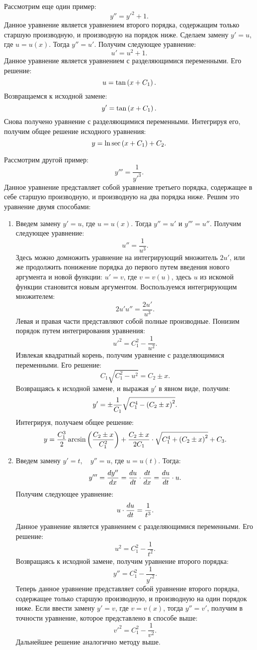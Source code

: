 		Рассмотрим еще один пример:
		\[ y'' = y'^2 + 1. \]
		Данное уравнение является уравнением второго порядка, содержащим только старшую производную, и производную на порядок ниже. Сделаем замену $y' = u$, где $u = u(x)$. Тогда $y'' = u'$. Получим следующее уравнение:
		\[ u' = u^2 + 1. \]
		Данное уравнение является уравнением с разделяющимися переменными. Его решение:
		\[ u = \tan\left( x + C_1 \right). \]
		Возвращаемся к исходной замене:
		\[ y' = \tan\left( x + C_1 \right). \]
		Снова получено уравнение с разделяющимися переменными. Интегрируя его, получим общее решение исходного уравнения:
		\[ y = \ln{\sec \left( x + C_1 \right) } + C_2. \]

		Рассмотрим другой пример:
		\[ y''' = \frac{1}{y'^3}. \]
		Данное уравнение представляет собой уравнение третьего порядка, содержащее в себе старшую производную, и производную на два порядка ниже. Решим это уравнение двумя способами:
		\begin{enumerate}
			\item Введем замену $y' = u$, где $u = u(x)$. Тогда $y'' = u'$ и $y''' = u''$. Получим следующее уравнение:
				\[ u'' = \frac{1}{u^3}. \]
				Здесь можно домножить уравнение на интегрирующий множитель $2u'$, или же продолжить понижение порядка до первого путем введения нового аргумента и новой функции: $u' = v$, где $v = v(u)$, здесь $u$ из искомой функции становится новым аргументом. Воспользуемся интегрирующим множителем:
				\[ 2u' u'' = \frac{2u'}{u^3}. \]
				Левая и правая части представляют собой полные производные. Понизим порядок путем интегрирования уравнения:
				\[ u'^2 = C_1^2 - \frac{1}{u^2}. \]
				Извлекая квадратный корень, получим уравнение с разделяющимися переменными. Его решение:
				\[ C_1 \sqrt{C_1^2 - u^2} = C_2 \pm x. \]
				Возвращаясь к исходной замене, и выражая $y'$ в явном виде, получим:
				\[ y' = \pm \frac{1}{C_1} \sqrt{C_1^4 - \left( C_2 \pm x \right)^2}. \]
				Интегрируя, получаем общее решение:
				\[ y = \frac{C_1^3}{2} \arcsin\left( \frac{C_2 \pm x}{C_1^2} \right) + \frac{C_2 \pm x}{2 C_1} \cdot \sqrt{C_1^4 + \left( C_2 \pm x \right)^2} + C_3. \]

			\item Введем замену $y' = t$, ~ $y'' = u$, где $u = u(t)$. Тогда:
				\[ y''' = \dfrac{d y''}{d x} = \dfrac{d u}{d t} \cdot \dfrac{d t}{d x} = \dfrac{d u}{d t} \cdot u. \]
				Получим следующее уравнение:
				\[ u \cdot \dfrac{d u}{d t} = \frac{1}{t^3}. \]
				Данное уравнение является уравнением с разделяющимися переменными. Его решение:
				\[ u^2 = C_1^2 - \frac{1}{t^2}. \]
				Возвращаясь к исходной замене, получим уравнение второго порядка:
				\[ y'' = C_1^2 - \frac{1}{y'^2}. \]
				Теперь данное уравнение представляет собой уравнение второго порядка, содержащее только старшую производную, и производную на один порядок ниже. Если ввести замену $y' = v$, где $v = v(x)$, тогда $y'' = v'$, получим в точности уравнение, которое представлено в способе выше:
				\[ v'^2 = C_1^2 - \frac{1}{v^2}. \]
				Дальнейшее решение аналогично методу выше.

		\end{enumerate}

